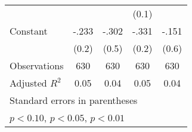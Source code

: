 \begin{table}[htbp]
\begin{tabular}{l*{4}{c}}
                &                  &                  &    (0.1)         &                  \\
Constant        &    -.233         &    -.302         &    -.331         &    -.151         \\
                &    (0.2)         &    (0.5)         &    (0.2)         &    (0.6)         \\
\hline
Observations    &      630         &      630         &      630         &      630         \\
Adjusted \(R^{2}\)&     0.05         &     0.04         &     0.05         &     0.04         \\
\hline\hline
\multicolumn{5}{l}{\footnotesize Standard errors in parentheses}\\
\multicolumn{5}{l}{\footnotesize \sym{*} \(p<0.10\), \sym{**} \(p<0.05\), \sym{***} \(p<0.01\)}\\
\end{tabular}
\end{table}
